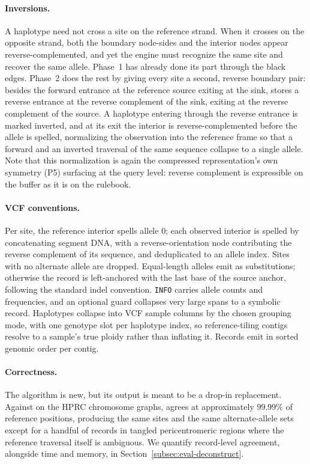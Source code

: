 \paragraph{Inversions.}
A haplotype need not cross a site on the reference strand. When it crosses on the
opposite strand, both the boundary node-sides and the interior nodes appear
reverse-complemented, and yet the engine must recognize the same site and recover
the same allele. Phase~1 has already done its part through the black edges. Phase~2
does the rest by giving every site a second, reverse boundary pair: besides the
forward entrance at the reference source exiting at the sink, \sys stores a
reverse entrance at the reverse complement of the sink, exiting at the reverse
complement of the source. A haplotype entering through the reverse entrance is
marked inverted, and at its exit the interior is reverse-complemented before the
allele is spelled, normalizing the observation into the reference frame so that a
forward and an inverted traversal of the same sequence collapse to a single
allele. Note that this normalization is again the compressed representation's own
symmetry (P5) surfacing at the query level: reverse complement is expressible on
the buffer as it is on the rulebook.

\paragraph{VCF conventions.}
Per site, the reference interior spells allele $0$; each observed interior is
spelled by concatenating segment DNA, with a reverse-orientation node
contributing the reverse complement of its sequence, and deduplicated to an allele
index. Sites with no alternate allele are dropped. Equal-length alleles emit as
substitutions; otherwise the record is left-anchored with the last base of the
source anchor, following the standard indel convention. \texttt{INFO} carries
allele counts and frequencies, and an optional guard collapses very large spans to
a symbolic record. Haplotypes collapse into VCF sample columns by the chosen
grouping mode, with one genotype slot per haplotype index, so reference-tiling
contigs resolve to a sample's true ploidy rather than inflating it. Records emit
in sorted genomic order per contig.

\paragraph{Correctness.}
The algorithm is new, but its output is meant to be a drop-in replacement.
Against  on the HPRC chromosome graphs, \sys agrees at
approximately $99.99\%$ of reference positions, producing the same sites and the
same alternate-allele sets except for a handful of records in tangled
pericentromeric regions where the reference traversal itself is ambiguous. We
quantify record-level agreement, alongside time and memory, in
Section~\ref{subsec:eval-deconstruct}.
